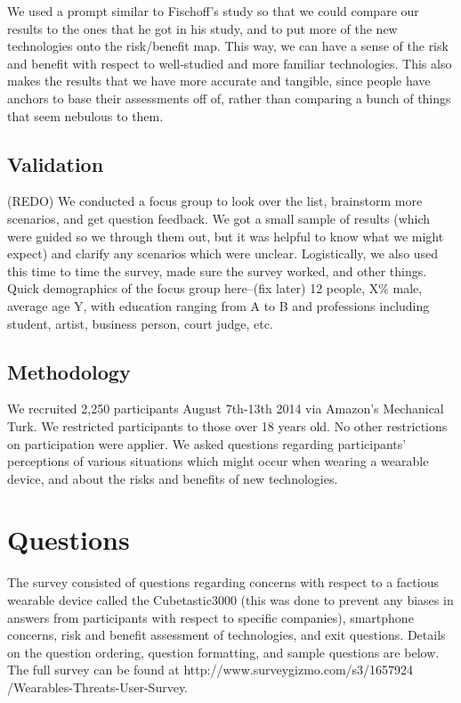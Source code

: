 \documentclass{acm_proc_article-sp}
\begin{document}
We used a prompt similar to Fischoff's study so that we could compare our results to the ones that he got in his study, and to put more of the new technologies onto the risk/benefit map. This way, we can have a sense of the risk and benefit with respect to well-studied and more familiar technologies. This also makes the results that we have more accurate and tangible, since people have anchors to base their assessments off of, rather than comparing a bunch of things that seem nebulous to them.

\subsection{Validation}
(REDO) We conducted a focus group to look over the list, brainstorm more scenarios,  and get question feedback. We got a small sample of results (which were guided so we through them out, but it was helpful to know what we might expect) and clarify any scenarios which were unclear. Logistically, we also used this time to time the survey, made sure the survey worked, and other things. Quick demographics of the focus group here--(fix later) 12 people, X\% male, average age Y, with education ranging from A to B and professions including student, artist, business person, court judge, etc.  

\subsection{Methodology}
We recruited 2,250 participants August 7th-13th 2014 via Amazon's Mechanical Turk. We restricted participants to those over 18 years old. No other restrictions on participation were applier. We asked questions regarding participants' perceptions of various situations which might occur when wearing a wearable device, and about the risks and benefits of new technologies.
 
 
\section{Questions}
The survey consisted of questions regarding concerns with respect to a factious wearable device called the Cubetastic3000 (this was done to prevent any biases in answers from participants with respect to specific companies), smartphone concerns, risk and benefit assessment of technologies, and exit questions. Details on the question ordering, question formatting, and sample questions are below. The full survey can be found at http://www.surveygizmo.com/s3/1657924 /Wearables-Threats-User-Survey. 
\end{document}
